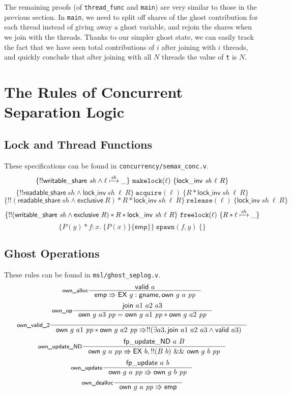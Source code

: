 \documentclass[11pt]{article}
\begin{document}
The remaining proofs (of \texttt{thread\_func} and \texttt{main}) are very similar to those in the previous section. In \texttt{main}, we need to split off shares of the ghost contribution for each thread instead of giving away a ghost variable, and rejoin the shares when we join with the threads. Thanks to our simpler ghost state, we can easily track the fact that we have seen total contributions of $i$ after joining with $i$ threads, and quickly conclude that after joining with all $N$ threads the value of \texttt{t} is $N$.

\section{The Rules of Concurrent Separation Logic}
\label{CSL}
\subsection{Lock and Thread Functions}
These specifications can be found in \texttt{concurrency/semax\_conc.v}.
$$\{!!\mathsf{writable\_share}\ \mathit{sh} \land \ell \xmapsto{\mathit{sh}} \_\}\ \texttt{makelock}(\ell)\ \{\mathsf{lock\_inv}\ \mathit{sh}\ \ell\ R\}$$
$$\{!!\mathsf{readable\_share}\ \mathit{sh} \land \mathsf{lock\_inv}\ \mathit{sh}\ \ell\ R\}\ \texttt{acquire}(\ell)\ \{R * \mathsf{lock\_inv}\ \mathit{sh}\ \ell\ R\}$$
$$\{!!(\mathsf{readable\_share}\ \mathit{sh} \land \mathsf{exclusive}\ R) * R * \mathsf{lock\_inv}\ \mathit{sh}\ \ell\ R\}\ \texttt{release}(\ell)\ \{\mathsf{lock\_inv}\ \mathit{sh}\ \ell\ R\}$$
$$\{!!(\mathsf{writable\_share}\ \mathit{sh} \land \mathsf{exclusive}\ R) * R * \mathsf{lock\_inv}\ \mathit{sh}\ \ell\ R\}\ \texttt{freelock}(\ell)\ \{R * \ell \xmapsto{\mathit{sh}} \_\}$$
$$\{P(y) * f : x.\ \{P(x)\}\{\mathsf{emp}\}\}\ \texttt{spawn}(f, y)\ \{\}$$

\subsection{Ghost Operations}
These rules can be found in \texttt{msl/ghost\_seplog.v}.
$$\inference[\textsf{own\_alloc}]{\mathsf{valid}\ a}{\mathsf{emp} \Rrightarrow \mathsf{EX}\ g : \mathsf{gname}, \mathsf{own}\ g\ a\ \mathit{pp}}$$
$$\inference[\textsf{own\_op}]{\mathsf{join}\ a1\ a2\ a3}{\mathsf{own}\ g\ a3\ \mathit{pp} = \mathsf{own}\ g\ a1\ \mathit{pp} * \mathsf{own}\ g\ a2\ \mathit{pp}}$$
$$\inference[\textsf{own\_valid\_2}]{}{\mathsf{own}\ g\ a1\ \mathit{pp} * \mathsf{own}\ g\ a2\ \mathit{pp} \Rrightarrow !!(\exists a3, \mathsf{join}\ a1\ a2\ a3 \land \mathsf{valid}\ a3)}$$
$$\inference[\textsf{own\_update\_ND}]{\mathsf{fp\_update\_ND}\ a\ B}{\mathsf{own}\ g\ a\ \mathit{pp} \Rrightarrow \mathsf{EX}\ b, !!(B\ b)\ \&\&\ \mathsf{own}\ g\ b\ \mathit{pp}}$$
$$\inference[\textsf{own\_update}]{\mathsf{fp\_update}\ a\ b}{\mathsf{own}\ g\ a\ \mathit{pp} \Rrightarrow \mathsf{own}\ g\ b\ \mathit{pp}}$$
$$\inference[\textsf{own\_dealloc}]{}{\mathsf{own}\ g\ a\ \mathit{pp} \Rrightarrow \mathsf{emp}}$$
\end{document}
